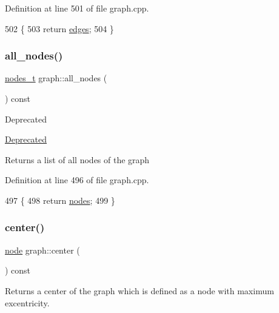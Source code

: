 Definition at line 501 of file graph.\+cpp.


\begin{DoxyCode}
502 \{
503     \textcolor{keywordflow}{return} \mbox{\hyperlink{classgraph_ab5b1c610cca1bcf72b05aacc28a48153}{edges}};
504 \}
\end{DoxyCode}
\mbox{\label{classgraph_a268af566b8df2cbaede1319ad370dc7e}} 
\subsubsection{\texorpdfstring{all\+\_\+nodes()}{all\_nodes()}}
{\footnotesize\ttfamily \mbox{\hyperlink{edge_8h_a22ac17689106ba21a84e7bc54d1199d6}{nodes\+\_\+t}} graph\+::all\+\_\+nodes (\begin{DoxyParamCaption}{ }\end{DoxyParamCaption}) const}

\begin{DoxyRefDesc}{Deprecated}
\item[\mbox{\hyperlink{deprecated__deprecated000003}{Deprecated}}]\end{DoxyRefDesc}
\begin{DoxyReturn}{Returns}
a list of all nodes of the graph 
\end{DoxyReturn}


Definition at line 496 of file graph.\+cpp.


\begin{DoxyCode}
497 \{
498     \textcolor{keywordflow}{return} \mbox{\hyperlink{classgraph_a4ea0592e8eb7c26c5abad24546907726}{nodes}};
499 \}
\end{DoxyCode}
\mbox{\label{classgraph_a351617e023b4b6833ab650a70fc086e7}} 
\subsubsection{\texorpdfstring{center()}{center()}}
{\footnotesize\ttfamily \mbox{\hyperlink{classnode}{node}} graph\+::center (\begin{DoxyParamCaption}{ }\end{DoxyParamCaption}) const}

Returns a center of the graph which is defined as a node with maximum excentricity.

